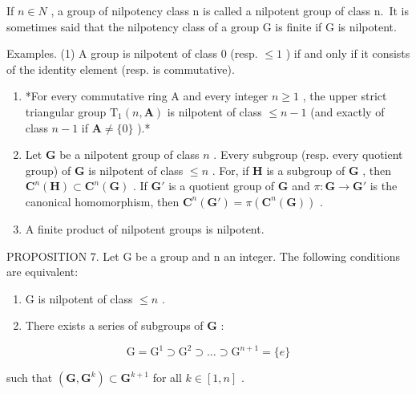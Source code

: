 If \(n \in N\) , a group of nilpotency class n is called a nilpotent group of class n.~It is sometimes said that the nilpotency class of a group G is finite if G is nilpotent.

Examples. (1) A group is nilpotent of class 0 (resp. \(\leqslant 1\) ) if and only if it consists of the identity element (resp. is commutative).

\begin{enumerate}
\def\labelenumi{(\arabic{enumi})}
\setcounter{enumi}{1}
\item
  *For every commutative ring A and every integer \(n \geqslant 1\) , the upper strict triangular group \(\mathrm{T}_1(n, \mathbf{A})\) is nilpotent of class \(\leqslant n - 1\) (and exactly of class \(n - 1\) if \(\mathbf{A} \neq \{0\}\) ).*
\item
  Let \(\mathbf{G}\) be a nilpotent group of class \(n\) . Every subgroup (resp. every quotient group) of \(\mathbf{G}\) is nilpotent of class \(\leqslant n\) . For, if \(\mathbf{H}\) is a subgroup of \(\mathbf{G}\) , then \(\mathbf{C}^n (\mathbf{H})\subset \mathbf{C}^n (\mathbf{G})\) . If \(\mathbf{G}'\) is a quotient group of \(\mathbf{G}\) and \(\pi : \mathbf{G}\to \mathbf{G}'\) is the canonical homomorphism, then \(\mathbf{C}^n (\mathbf{G}') = \pi (\mathbf{C}^n (\mathbf{G}))\) .
\item
  A finite product of nilpotent groups is nilpotent.
\end{enumerate}

PROPOSITION 7. Let G be a group and n an integer. The following conditions are equivalent:

\begin{enumerate}
\def\labelenumi{(\alph{enumi})}
\item
  G is nilpotent of class \(\leqslant n\) .
\item
  There exists a series of subgroups of \(\mathbf{G}\) :
\end{enumerate}

\[
\mathrm{G} = \mathrm{G} ^ {1} \supset \mathrm{G} ^ {2} \supset \dots \supset \mathrm{G} ^ {n + 1} = \{e \}
\]

such that \((\mathbf{G},\mathbf{G}^k)\subset \mathbf{G}^{k + 1}\) for all \(k\in [1,n]\) .

